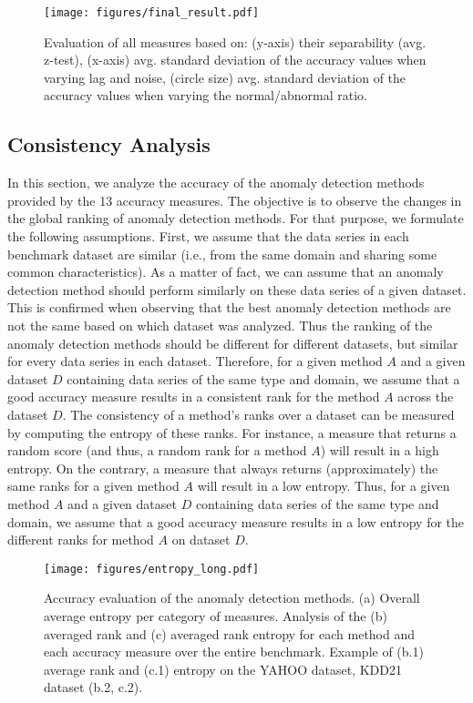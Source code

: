 \begin{figure}[tb]
  \centering
  \texttt{[image: figures/final\_result.pdf]}
  \caption{Evaluation of all measures based on: (y-axis) their separability (avg. z-test), (x-axis) avg. standard deviation of the accuracy values when varying lag and noise, (circle size) avg. standard deviation of the accuracy values when varying the normal/abnormal ratio.}
  \label{fig:global}
\end{figure}




\subsection{Consistency Analysis}
\label{sec:entropy}

In this section, we analyze the accuracy of the anomaly detection methods provided by the 13 accuracy measures. The objective is to observe the changes in the global ranking of anomaly detection methods. For that purpose, we formulate the following assumptions. First, we assume that the data series in each benchmark dataset are similar (i.e., from the same domain and sharing some common characteristics). As a matter of fact, we can assume that an anomaly detection method should perform similarly on these data series of a given dataset. This is confirmed when observing that the best anomaly detection methods are not the same based on which dataset was analyzed. Thus the ranking of the anomaly detection methods should be different for different datasets, but similar for every data series in each dataset. 
Therefore, for a given method $A$ and a given dataset $D$ containing data series of the same type and domain, we assume that a good accuracy measure results in a consistent rank for the method $A$ across the dataset $D$. 
The consistency of a method's ranks over a dataset can be measured by computing the entropy of these ranks. 
For instance, a measure that returns a random score (and thus, a random rank for a method $A$) will result in a high entropy. 
On the contrary, a measure that always returns (approximately) the same ranks for a given method $A$ will result in a low entropy. 
Thus, for a given method $A$ and a given dataset $D$ containing data series of the same type and domain, we assume that a good accuracy measure results in a low entropy for the different ranks for method $A$ on dataset $D$.

\begin{figure*}[tb]
  \centering
  \texttt{[image: figures/entropy\_long.pdf]}
  \caption{Accuracy evaluation of the anomaly detection methods. (a) Overall average entropy per category of measures. Analysis of the (b) averaged rank and (c) averaged rank entropy for each method and each accuracy measure over the entire benchmark. Example of (b.1) average rank and (c.1) entropy on the YAHOO dataset, KDD21 dataset (b.2, c.2). }
  \label{fig:entropy}
\end{figure*}

